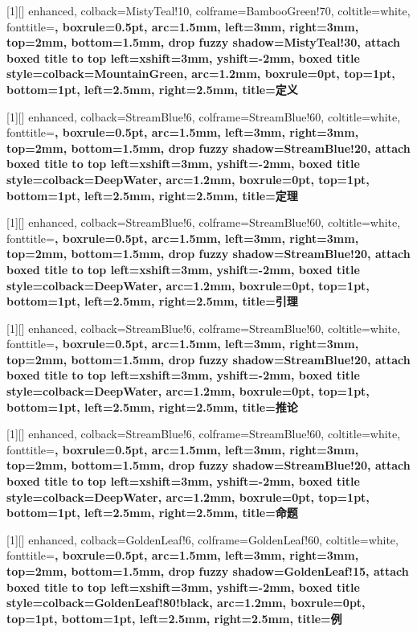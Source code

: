 [1][]{
  enhanced, colback=MistyTeal!10, colframe=BambooGreen!70,
  coltitle=white, fonttitle=\bfseries\small,
  boxrule=0.5pt, arc=1.5mm, left=3mm, right=3mm, top=2mm, bottom=1.5mm,
  drop fuzzy shadow=MistyTeal!30,
  attach boxed title to top left={xshift=3mm, yshift=-2mm},
  boxed title style={colback=MountainGreen, arc=1.2mm, boxrule=0pt,
    top=1pt, bottom=1pt, left=2.5mm, right=2.5mm},
  title={定义 \thetcbcounter{}}
}

[1][]{
  enhanced, colback=StreamBlue!6, colframe=StreamBlue!60,
  coltitle=white, fonttitle=\bfseries\small,
  boxrule=0.5pt, arc=1.5mm, left=3mm, right=3mm, top=2mm, bottom=1.5mm,
  drop fuzzy shadow=StreamBlue!20,
  attach boxed title to top left={xshift=3mm, yshift=-2mm},
  boxed title style={colback=DeepWater, arc=1.2mm, boxrule=0pt,
    top=1pt, bottom=1pt, left=2.5mm, right=2.5mm},
  title={定理 \thetcbcounter{}}
}

[1][]{
  enhanced, colback=StreamBlue!6, colframe=StreamBlue!60,
  coltitle=white, fonttitle=\bfseries\small,
  boxrule=0.5pt, arc=1.5mm, left=3mm, right=3mm, top=2mm, bottom=1.5mm,
  drop fuzzy shadow=StreamBlue!20,
  attach boxed title to top left={xshift=3mm, yshift=-2mm},
  boxed title style={colback=DeepWater, arc=1.2mm, boxrule=0pt,
    top=1pt, bottom=1pt, left=2.5mm, right=2.5mm},
  title={引理 \thetcbcounter{}}
}

[1][]{
  enhanced, colback=StreamBlue!6, colframe=StreamBlue!60,
  coltitle=white, fonttitle=\bfseries\small,
  boxrule=0.5pt, arc=1.5mm, left=3mm, right=3mm, top=2mm, bottom=1.5mm,
  drop fuzzy shadow=StreamBlue!20,
  attach boxed title to top left={xshift=3mm, yshift=-2mm},
  boxed title style={colback=DeepWater, arc=1.2mm, boxrule=0pt,
    top=1pt, bottom=1pt, left=2.5mm, right=2.5mm},
  title={推论 \thetcbcounter{}}
}

[1][]{
  enhanced, colback=StreamBlue!6, colframe=StreamBlue!60,
  coltitle=white, fonttitle=\bfseries\small,
  boxrule=0.5pt, arc=1.5mm, left=3mm, right=3mm, top=2mm, bottom=1.5mm,
  drop fuzzy shadow=StreamBlue!20,
  attach boxed title to top left={xshift=3mm, yshift=-2mm},
  boxed title style={colback=DeepWater, arc=1.2mm, boxrule=0pt,
    top=1pt, bottom=1pt, left=2.5mm, right=2.5mm},
  title={命题 \thetcbcounter{}}
}

[1][]{
  enhanced, colback=GoldenLeaf!6, colframe=GoldenLeaf!60,
  coltitle=white, fonttitle=\bfseries\small,
  boxrule=0.5pt, arc=1.5mm, left=3mm, right=3mm, top=2mm, bottom=1.5mm,
  drop fuzzy shadow=GoldenLeaf!15,
  attach boxed title to top left={xshift=3mm, yshift=-2mm},
  boxed title style={colback=GoldenLeaf!80!black, arc=1.2mm, boxrule=0pt,
    top=1pt, bottom=1pt, left=2.5mm, right=2.5mm},
  title={例 \thetcbcounter{}}
}
